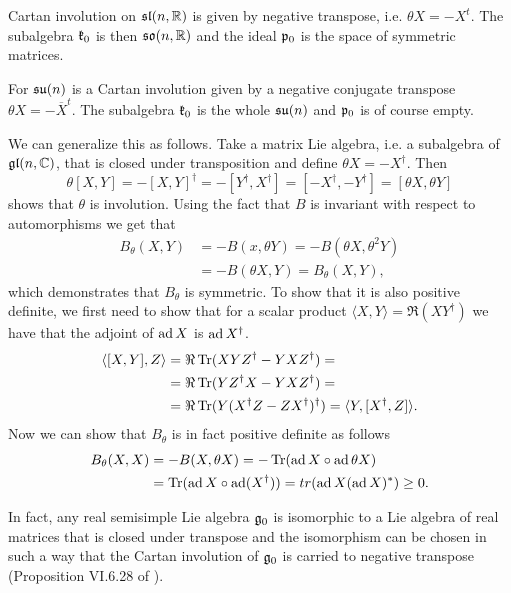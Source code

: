 \begin{example}
  Cartan involution on $\mathfrak{sl}(n,\mathbb{R})$ is given by negative transpose, i.e. $\theta X = - X^t$. The subalgebra $\mathfrak{k}_0$ is then $\mathfrak{so}(n,\mathbb{R})$ and the ideal $\mathfrak{p}_0$ is the space of symmetric matrices.

 For $\mathfrak{su}(n)$ is a Cartan involution given by a negative conjugate transpose $\theta X = - \overline{X}^t$. The subalgebra $\mathfrak{k}_0$ is the whole $\mathfrak{su}(n)$ and $\mathfrak{p}_0$ is of course empty.
\end{example}

We can generalize this as follows. Take a matrix Lie algebra, i.e. a subalgebra of $\mathfrak{gl}(n,\mathbb{C})$, that is closed under transposition and define $\theta X = -X^\dag$. Then
 \[
  \theta [X,Y] = -[X,Y]^\dag = - [Y^\dag,X^\dag] = [-X^\dag,-Y^\dag] = [\theta X, \theta Y]
 \]
 shows that $\theta$ is involution. Using the fact that $B$ is invariant with respect to automorphisms we get that
 \begin{align*}
  B_\theta(X,Y) &= -B(x,\theta Y) = - B(\theta X, \theta^2 Y) \\
                &= -B(\theta X, Y) = B_\theta(X,Y),
 \end{align*}
 which demonstrates that $B_\theta$ is symmetric. To show that it is also positive definite, we first need to show that for a scalar product $\langle X,Y \rangle = \Re (XY^\dag)$ we have that the adjoint of $\operatorname{\mathrm{ad}} X$ is $\operatorname{\mathrm{ad}} X^\dag$.
 \begin{align*}
  \langle [X,Y],Z \rangle &= \Re\tr (XYZ^\dag - YXZ^\dag) = \\
			  &= \Re\tr (YZ^\dag X - YXZ^\dag) =  \\%
                          &= \Re\tr( Y(X^\dag Z - ZX^\dag)^\dag) = \langle Y, [X^\dag,Z] \rangle.
 \end{align*}
 Now we can show that $B_\theta$ is in fact positive definite as follows
 \begin{align*}
  B_\theta(X,X) &= -B(X,\theta X) = -\operatorname{\mathrm{Tr}} (\operatorname{\mathrm{ad}} X \circ \operatorname{\mathrm{ad}} \theta X )\\
                &= \operatorname{\mathrm{Tr}} (\operatorname{\mathrm{ad}} X \circ \operatorname{\mathrm{ad}} (X^\dag))  = tr (\operatorname{\mathrm{ad}} X (\operatorname{\mathrm{ad}} X)^*) \geq 0.
 \end{align*}

In fact, any real semisimple Lie algebra $\mathfrak{g}_0$ is isomorphic to a Lie algebra of real matrices that is closed under transpose and the isomorphism can be chosen in such a way that the Cartan involution of $\mathfrak{g}_0$ is carried to negative transpose (Proposition VI.6.28 of \cite{knapp}).

